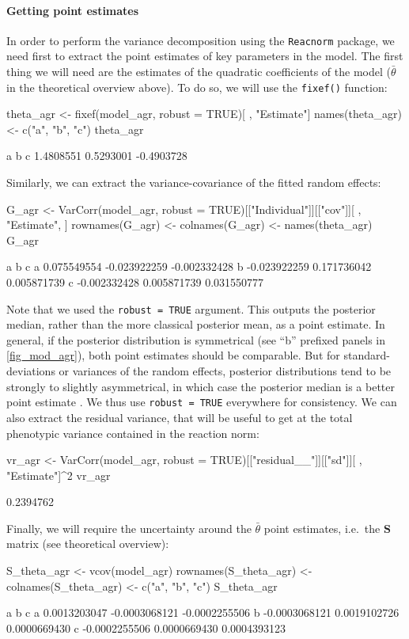 \documentclass[a4paper,12pt,twoside]{article}
\begin{document}
\paragraph{Getting point estimates}
In order to perform the variance decomposition using the \texttt{Reacnorm} package, we need first to extract the point estimates of key parameters in the model. The first thing we will need are the estimates of the quadratic coefficients of the model ($\bar{\theta}$ in the theoretical overview above). To do so, we will use the \texttt{fixef()} function:
\begin{Rinput}
theta_agr <- fixef(model_agr, robust = TRUE)[ , "Estimate"]
names(theta_agr) <- c("a", "b", "c")
theta_agr
\end{Rinput}
\begin{Routput}
         a          b          c 
 1.4808551  0.5293001 -0.4903728 
\end{Routput}
Similarly, we can extract the variance-covariance of the fitted random effects:
\begin{Rinput}
G_agr <-
    VarCorr(model_agr, robust = TRUE)[["Individual"]][["cov"]][ , "Estimate", ]
rownames(G_agr) <- colnames(G_agr) <- names(theta_agr)
G_agr
\end{Rinput}
\begin{Routput}
             a            b            c
a  0.075549554 -0.023922259 -0.002332428
b -0.023922259  0.171736042  0.005871739
c -0.002332428  0.005871739  0.031550777
\end{Routput}
Note that we used the \texttt{robust = TRUE} argument. This outputs the posterior median, rather than the more classical posterior mean, as a point estimate. In general, if the posterior distribution is symmetrical (see ``b'' prefixed panels in \autoref{fig_mod_agr}), both point estimates should be comparable.
But for standard-deviations or variances of the random effects, posterior distributions tend to be strongly to slightly asymmetrical, in which case the posterior median is a better point estimate \autocite{pick_describing_2023}.
We thus use \texttt{robust = TRUE} everywhere for consistency.
We can also extract the residual variance, that will be useful to get at the total phenotypic variance contained in the reaction norm:
\begin{Rinput}
vr_agr <- VarCorr(model_agr, robust = TRUE)[["residual__"]][["sd"]][ , "Estimate"]^2
vr_agr
\end{Rinput}
\begin{Routput}
[1] 0.2394762
\end{Routput}
Finally, we will require the uncertainty around the $\bar{\theta}$ point estimates, i.e.\ the $\mathbf{S}$ matrix (see theoretical overview):
\begin{Rinput}
S_theta_agr <- vcov(model_agr)
rownames(S_theta_agr) <- colnames(S_theta_agr) <- c("a", "b", "c")
S_theta_agr
\end{Rinput}
\begin{Routput}
              a             b             c
a  0.0013203047 -0.0003068121 -0.0002255506
b -0.0003068121  0.0019102726  0.0000669430
c -0.0002255506  0.0000669430  0.0004393123
\end{Routput}
\end{document}
